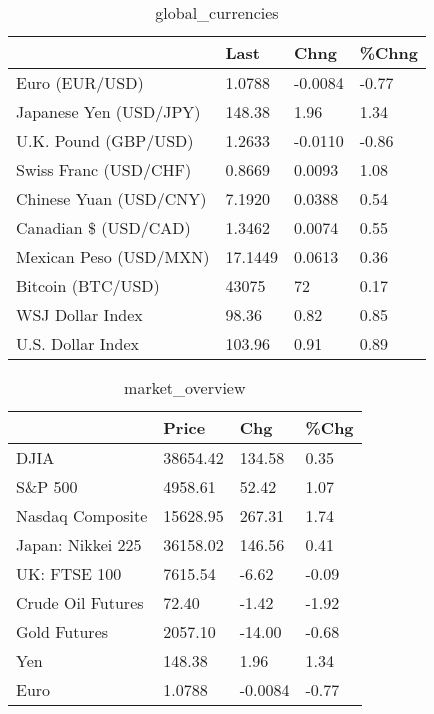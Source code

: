 \documentclass{article}%
\begin{document}
%


\begin{table}[htbp]%
\caption{global\_currencies}%
\centering%
\begin{adjustbox}{width=1\textwidth}%
\begin{tabular}{llll}
\toprule
                       &    Last &    Chng & \%Chng \\
\midrule
        Euro (EUR/USD) &  1.0788 & -0.0084 & -0.77 \\
Japanese Yen (USD/JPY) &  148.38 &    1.96 &  1.34 \\
  U.K. Pound (GBP/USD) &  1.2633 & -0.0110 & -0.86 \\
 Swiss Franc (USD/CHF) &  0.8669 &  0.0093 &  1.08 \\
Chinese Yuan (USD/CNY) &  7.1920 &  0.0388 &  0.54 \\
  Canadian \$ (USD/CAD) &  1.3462 &  0.0074 &  0.55 \\
Mexican Peso (USD/MXN) & 17.1449 &  0.0613 &  0.36 \\
     Bitcoin (BTC/USD) &   43075 &      72 &  0.17 \\
      WSJ Dollar Index &   98.36 &    0.82 &  0.85 \\
     U.S. Dollar Index &  103.96 &    0.91 &  0.89 \\
\bottomrule
\end{tabular}
%
\end{adjustbox}%
\end{table}

%


\begin{table}[htbp]%
\caption{market\_overview}%
\centering%
\begin{adjustbox}{width=1\textwidth}%
\begin{tabular}{llll}
\toprule
                  &    Price &     Chg &  \%Chg \\
\midrule
             DJIA & 38654.42 &  134.58 &  0.35 \\
          S\&P 500 &  4958.61 &   52.42 &  1.07 \\
 Nasdaq Composite & 15628.95 &  267.31 &  1.74 \\
Japan: Nikkei 225 & 36158.02 &  146.56 &  0.41 \\
     UK: FTSE 100 &  7615.54 &   -6.62 & -0.09 \\
Crude Oil Futures &    72.40 &   -1.42 & -1.92 \\
     Gold Futures &  2057.10 &  -14.00 & -0.68 \\
              Yen &   148.38 &    1.96 &  1.34 \\
             Euro &   1.0788 & -0.0084 & -0.77 \\
\bottomrule
\end{tabular}
%
\end{adjustbox}%
\end{table}

%
\end{document}
